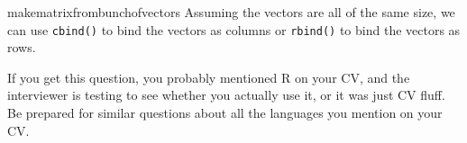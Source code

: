 \begin{answer}{makematrixfrombunchofvectors}
Assuming the vectors are all of the same size, we can use
\verb+cbind()+ to bind the vectors as columns
or
\verb+rbind()+
to bind the vectors as rows.

If you get this question, you probably mentioned R \citep{RCoreTeam} on your CV, and the interviewer is testing to see whether you actually use it, or it was just CV fluff.
Be prepared for similar questions about all the languages you mention on your CV.
\end{answer}
